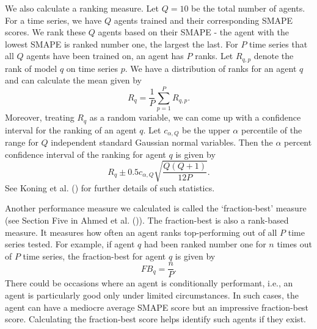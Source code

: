 We also calculate a ranking measure. Let $Q=10$ be the total number of agents. For a time series, we have $Q$ agents trained and their corresponding SMAPE scores. We rank these $Q$ agents based on their SMAPE - the agent with the lowest SMAPE is ranked number one, the largest the last. For $P$ time series that all $Q$ agents have been trained on, an agent has $P$ ranks. Let $R_{q, p}$ denote the rank of model $q$ on time series $p$. We have a distribution of ranks for an agent $q$ and can calculate the mean given by
\begin{equation*}
    R_q = \frac{1}{P} \sum_{p = 1}^{P}R_{q, p}.
\end{equation*}
Moreover, treating $R_q$ as a random variable, we can come up with a confidence interval for the ranking of an agent $q$. Let $c_{\alpha, Q}$ be the upper $\alpha$ percentile of the range for $Q$ independent standard Gaussian normal variables. Then the $\alpha$ percent confidence interval of the ranking for agent $q$ is given by
\begin{equation*}
    R_q \pm 0.5 c_{\alpha, Q} \sqrt{\frac{Q(Q+1)}{12 P}}.
\end{equation*}
See Koning et al. (\citeyear{KONING2005397}) for further details of such statistics.

Another performance measure we calculated is called the `fraction-best' measure (see Section Five in Ahmed et al. (\citeyear{2010EmpiricalMLComparison})). The fraction-best is also a rank-based measure. It measures how often an agent ranks top-performing out of all $P$ time series tested. For example, if agent $q$ had been ranked number one for $n$ times out of $P$ time series, the fraction-best for agent $q$ is given by
\begin{equation*}
    FB_q = \frac{n}{P}.
\end{equation*}
There could be occasions where an agent is conditionally performant, i.e., an agent is particularly good only under limited circumstances. In such cases, the agent can have a mediocre average SMAPE score but an impressive fraction-best score. Calculating the fraction-best score helps identify such agents if they exist.

